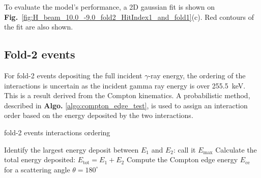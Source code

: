 To evaluate the model's performance, a 2D gaussian fit is shown on \textbf{Fig.}~\ref{fig:H_beam_10.0_-9.0_fold2_HitIndex1_and_fold1}(c). Red contours of the fit are also shown.


\subsection{Fold-2 events}
For fold-2 events depositing the full incident $\gamma$-ray energy, the ordering of the interactions is uncertain as the incident gamma ray energy is over 255.5~keV. This is a result derived from the Compton kinematics. A probabilistic method, described in \textbf{Algo.} \ref{algo:compton_edge_test}, is used to assign an interaction order based on the energy deposited by the two interactions.


\begin{algorithm}[h]
\label{algo:compton_edge_test}
\caption{fold-2 events interactions ordering}
Identify the largest energy deposit between $E_1$ and $E_2$: call it $E_\text{max}$\;
Calculate the total energy deposited: $E_\text{tot} = E_1 + E_2$\;
Compute the Compton edge energy $E_\text{ce}$ for a scattering angle $\theta = 180^\circ$\;
\end{algorithm}

